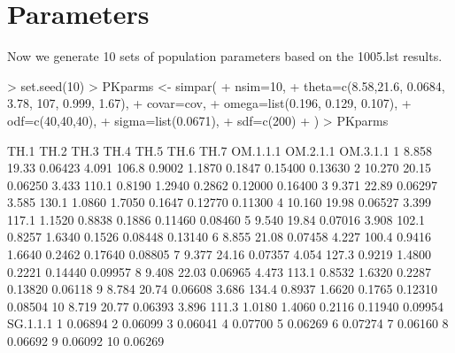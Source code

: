 \section{Parameters}
Now we generate 10 sets of population parameters based on the 1005.lst results.
\begin{Schunk}
\begin{Sinput}
> set.seed(10)
> PKparms <- simpar(
+     nsim=10,
+     theta=c(8.58,21.6, 0.0684, 3.78, 107, 0.999, 1.67),
+     covar=cov,
+     omega=list(0.196, 0.129, 0.107),
+     odf=c(40,40,40),
+     sigma=list(0.0671),
+     sdf=c(200)
+ )
> PKparms
\end{Sinput}
\begin{Soutput}
     TH.1  TH.2    TH.3  TH.4  TH.5   TH.6   TH.7 OM.1.1.1 OM.2.1.1 OM.3.1.1
1   8.858 19.33 0.06423 4.091 106.8 0.9002 1.1870   0.1847  0.15400  0.13630
2  10.270 20.15 0.06250 3.433 110.1 0.8190 1.2940   0.2862  0.12000  0.16400
3   9.371 22.89 0.06297 3.585 130.1 1.0860 1.7050   0.1647  0.12770  0.11300
4  10.160 19.98 0.06527 3.399 117.1 1.1520 0.8838   0.1886  0.11460  0.08460
5   9.540 19.84 0.07016 3.908 102.1 0.8257 1.6340   0.1526  0.08448  0.13140
6   8.855 21.08 0.07458 4.227 100.4 0.9416 1.6640   0.2462  0.17640  0.08805
7   9.377 24.16 0.07357 4.054 127.3 0.9219 1.4800   0.2221  0.14440  0.09957
8   9.408 22.03 0.06965 4.473 113.1 0.8532 1.6320   0.2287  0.13820  0.06118
9   8.784 20.74 0.06608 3.686 134.4 0.8937 1.6620   0.1765  0.12310  0.08504
10  8.719 20.77 0.06393 3.896 111.3 1.0180 1.4060   0.2116  0.11940  0.09954
   SG.1.1.1
1   0.06894
2   0.06099
3   0.06041
4   0.07700
5   0.06269
6   0.07274
7   0.06160
8   0.06692
9   0.06092
10  0.06269
\end{Soutput}
\end{Schunk}

